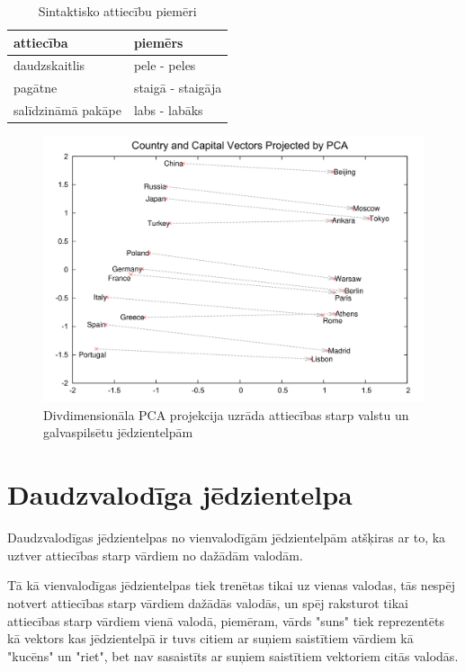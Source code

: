 \begin{table}[htbp]
	\centering
	\caption{Sintaktisko attiecību piemēri \cite{word2vec2013}}
	\begin{tabular}{ll}\toprule
		attiecība & piemērs  \\\midrule
		daudzskaitlis   & pele - peles \\
		pagātne   & staigā - staigāja \\
		salīdzināmā pakāpe   & labs - labāks \\\bottomrule
	\end{tabular}%
	\label{tab:sintactic-relationship-examples}%
\end{table}


\begin{figure}[h]
	\centering
	\includegraphics[width=\textwidth]{figures/word2vec-country-capital.png}
	\caption{Divdimensionāla PCA projekcija uzrāda attiecības starp valstu un galvaspilsētu jēdzientelpām \cite{colyer2016}}
	\label{fig:country-capital}%
\end{figure}



\section{Daudzvalodīga jēdzientelpa}

Daudzvalodīgas jēdzientelpas no vienvalodīgām jēdzientelpām atšķiras ar to, ka uztver attiecības starp vārdiem no dažādām valodām.

Tā kā vienvalodīgas jēdzientelpas tiek trenētas tikai uz vienas valodas, tās nespēj notvert attiecības starp vārdiem dažādās valodās, un spēj raksturot tikai attiecības starp vārdiem vienā valodā, piemēram, vārds "suns" tiek reprezentēts kā vektors kas jēdzientelpā ir tuvs citiem ar suņiem saistītiem vārdiem kā "kucēns" un "riet", bet nav sasaistīts ar suņiem saistītiem vektoriem citās valodās.


